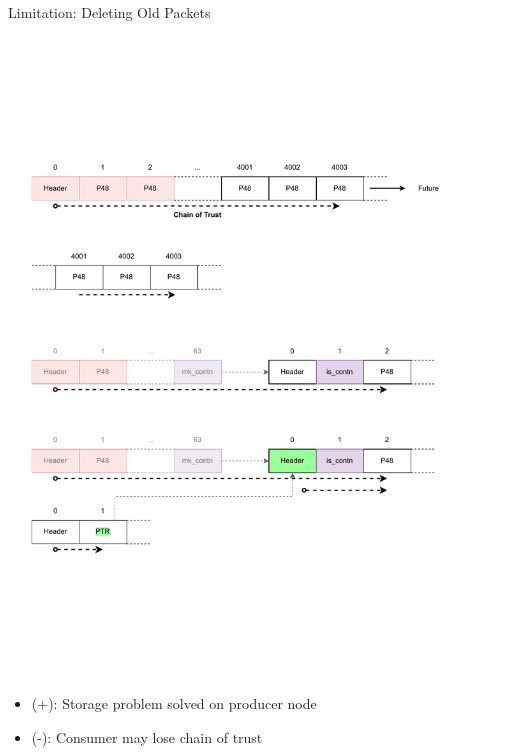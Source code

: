 \documentclass[aspectratio=169]{beamer}
\begin{document}
\begin{frame}[c]{Limitation: Deleting Old Packets}
\includegraphics[width=1\textwidth]{images/session_3.pdf}
\begin{itemize}
	\item (+): Storage problem solved on producer node
	\item (-): Consumer may lose chain of trust
\end{itemize}
\end{frame}
\end{document}
